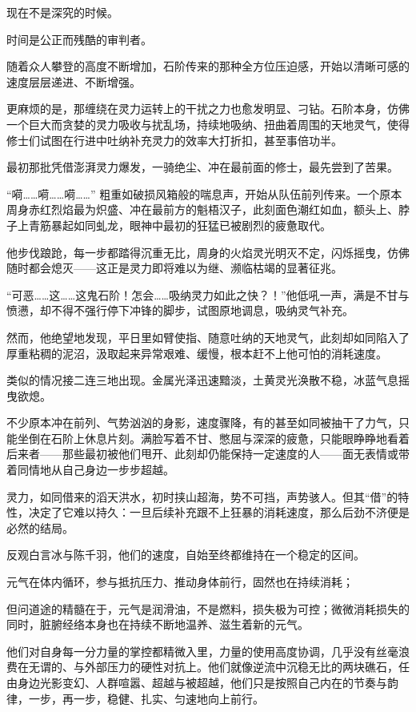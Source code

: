 现在不是深究的时候。

\vspace{2em}

时间是公正而残酷的审判者。

随着众人攀登的高度不断增加，石阶传来的那种全方位压迫感，开始以清晰可感的速度层层递进、不断增强。

更麻烦的是，那缠绕在灵力运转上的干扰之力也愈发明显、刁钻。石阶本身，仿佛一个巨大而贪婪的灵力吸收与扰乱场，持续地吸纳、扭曲着周围的天地灵气，使得修士们试图在行进中吐纳补充灵力的效率大打折扣，甚至事倍功半。

最初那批凭借澎湃灵力爆发，一骑绝尘、冲在最前面的修士，最先尝到了苦果。

“嗬……嗬……嗬……” 粗重如破损风箱般的喘息声，开始从队伍前列传来。一个原本周身赤红烈焰最为炽盛、冲在最前方的魁梧汉子，此刻面色潮红如血，额头上、脖子上青筋暴起如同虬龙，眼神中最初的狂猛已被剧烈的疲惫取代。

他步伐踉跄，每一步都踏得沉重无比，周身的火焰灵光明灭不定，闪烁摇曳，仿佛随时都会熄灭——这正是灵力即将难以为继、濒临枯竭的显著征兆。

“可恶……这……这鬼石阶！怎会……吸纳灵力如此之快？！”他低吼一声，满是不甘与愤懑，却不得不强行停下冲锋的脚步，试图原地调息，吸纳灵气补充。

然而，他绝望地发现，平日里如臂使指、随意吐纳的天地灵气，此刻却如同陷入了厚重粘稠的泥沼，汲取起来异常艰难、缓慢，根本赶不上他可怕的消耗速度。

类似的情况接二连三地出现。金属光泽迅速黯淡，土黄灵光涣散不稳，冰蓝气息摇曳欲熄。

不少原本冲在前列、气势汹汹的身影，速度骤降，有的甚至如同被抽干了力气，只能坐倒在石阶上休息片刻。满脸写着不甘、憋屈与深深的疲惫，只能眼睁睁地看着后来者——那些最初被他们甩开、此刻却仍能保持一定速度的人——面无表情或带着同情地从自己身边一步步超越。

灵力，如同借来的滔天洪水，初时挟山超海，势不可挡，声势骇人。但其“借”的特性，决定了它难以持久：一旦后续补充跟不上狂暴的消耗速度，那么后劲不济便是必然的结局。

反观白言冰与陈千羽，他们的速度，自始至终都维持在一个稳定的区间。

元气在体内循环，参与抵抗压力、推动身体前行，固然也在持续消耗；

但问道途的精髓在于，元气是润滑油，不是燃料，损失极为可控；微微消耗损失的同时，脏腑经络本身也在持续不断地温养、滋生着新的元气。

他们对自身每一分力量的掌控都精微入里，力量的使用高度协调，几乎没有丝毫浪费在无谓的、与外部压力的硬性对抗上。他们就像逆流中沉稳无比的两块礁石，任由身边光影变幻、人群喧嚣、超越与被超越，他们只是按照自己内在的节奏与韵律，一步，再一步，稳健、扎实、匀速地向上前行。

